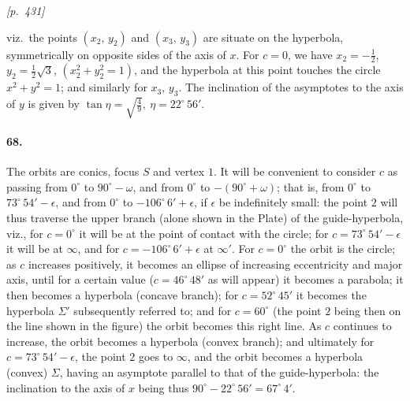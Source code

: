 \documentclass[11pt]{article}
\begin{document}
\medskip
\noindent\textit{[p.~431]}

\medskip

viz.\ the points $(x_{2},\, y_{2})$ and $(x_{3},\, y_{3})$ are situate on the hyperbola, symmetrically on opposite sides of the axis of $x$. For $c=0$, we have $x_{2} = -\tfrac{1}{2}$, $y_{2} = \tfrac{1}{2}\sqrt{3}$, $(x_{2}^{2} + y_{2}^{2} = 1)$, and the hyperbola at this point touches the circle $x^{2} + y^{2} = 1$; and similarly for $x_{3},\, y_{3}$. The inclination of the asymptotes to the axis of $y$ is given by $\tan\eta = \sqrt{\tfrac{4}{9}},\ \eta = 22^{\circ}\,56'$.

\paragraph{68.} The orbits are conics, focus $S$ and vertex $1$. It will be convenient to consider $c$ as passing from $0^{\circ}$ to $90^{\circ}-\omega$, and from $0^{\circ}$ to $-(90^{\circ}+\omega)$; that is, from $0^{\circ}$ to $73^{\circ}\,54'-\epsilon$, and from $0^{\circ}$ to $-106^{\circ}\,6'+\epsilon$, if $\epsilon$ be indefinitely small: the point $2$ will thus traverse the upper branch (alone shown in the Plate) of the guide-hyperbola, viz., for $c=0^{\circ}$ it will be at the point of contact with the circle; for $c=73^{\circ}\,54'-\epsilon$ it will be at $\infty$, and for $c=-106^{\circ}\,6'+\epsilon$ at $\infty'$. For $c=0^{\circ}$ the orbit is the circle; as $c$ increases positively, it becomes an ellipse of increasing eccentricity and major axis, until for a certain value ($c=46^{\circ}\,48'$ as will appear) it becomes a parabola; it then becomes a hyperbola (concave branch); for $c=52^{\circ}\,45'$ it becomes the hyperbola $\Sigma'$ subsequently referred to; and for $c=60^{\circ}$ (the point $2$ being then on the line shown in the figure) the orbit becomes this right line. As $c$ continues to increase, the orbit becomes a hyperbola (convex branch); and ultimately for $c=73^{\circ}\,54'-\epsilon$, the point $2$ goes to $\infty$, and the orbit becomes a hyperbola (convex) $\Sigma$, having an asymptote parallel to that of the guide-hyperbola: the inclination to the axis of $x$ being thus $90^{\circ} - 22^{\circ}\,56' = 67^{\circ}\,4'$.
\end{document}

